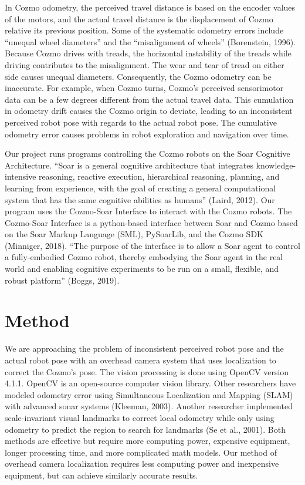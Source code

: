 \documentclass[man]{apa6}
\begin{document}
In Cozmo odometry, the perceived travel distance is based on the encoder values of the motors, and the actual travel distance is the displacement of Cozmo relative its previous position. Some of the systematic odometry errors include “unequal wheel diameters” and the “misalignment of wheels” (Borenstein, 1996). Because Cozmo drives with treads, the horizontal instability of the treads while driving contributes to the misalignment. The wear and tear of tread on either side causes unequal diameters. Consequently, the Cozmo odometry can be inaccurate. For example, when Cozmo turns, Cozmo’s perceived sensorimotor data can be a few degrees different from the actual travel data. This cumulation in odometry drift causes the Cozmo origin to deviate, leading to an inconsistent perceived robot pose with regards to the actual robot pose. The cumulative odometry error causes problems in robot exploration and navigation over time.

Our project runs programs controlling the Cozmo robots on the Soar Cognitive Architecture. “Soar is a general cognitive architecture that integrates knowledge-intensive reasoning, reactive execution, hierarchical reasoning, planning, and learning from experience, with the goal of creating a general computational system that has the same cognitive abilities as humans” (Laird, 2012). Our program uses the Cozmo-Soar Interface to interact with the Cozmo robots. The Cozmo-Soar Interface is a python-based interface between Soar and Cozmo based on the Soar Markup Language (SML), PySoarLib, and the Cozmo SDK (Minniger, 2018). “The purpose of the interface is to allow a Soar agent to control a fully-embodied Cozmo robot, thereby embodying the Soar agent in the real world and enabling cognitive experiments to be run on a small, flexible, and robust platform” (Boggs, 2019).


\section{Method}
We are approaching the problem of inconsistent perceived robot pose and the actual robot pose with an overhead camera system that uses localization to correct the Cozmo's pose. The vision processing is done using OpenCV version 4.1.1. OpenCV is an open-source computer vision library. Other researchers have modeled odometry error using Simultaneous Localization and Mapping (SLAM) with advanced sonar systems (Kleeman, 2003). Another researcher implemented scale-invariant visual landmarks to correct local odometry while only using odometry to predict the region to search for landmarks (Se et al., 2001). Both methods are effective but require more computing power, expensive equipment, longer processing time, and more complicated math models. Our method of overhead camera localization requires less computing power and inexpensive equipment, but can achieve similarly accurate results.
\end{document}
